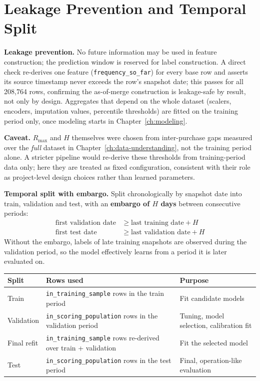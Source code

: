 \section{Leakage Prevention and Temporal Split}
\label{sec:5-6}

\textbf{Leakage prevention.} No future information may be used in feature construction; the prediction window is reserved for label construction. A direct check re-derives one feature (\texttt{frequency\_so\_far}) for every base row and asserts its source timestamp never exceeds the row's snapshot date; this passes for all 208,764 rows, confirming the as-of-merge construction is leakage-safe by result, not only by design. Aggregates that depend on the whole dataset (scalers, encoders, imputation values, percentile thresholds) are fitted on the training period only, once modeling starts in Chapter~\ref{ch:modeling}.

\textbf{Caveat.} $R_{\max}$ and $H$ themselves were chosen from inter-purchase gaps measured over the \emph{full} dataset in Chapter~\ref{ch:data-understanding}, not the training period alone. A stricter pipeline would re-derive these thresholds from training-period data only; here they are treated as fixed configuration, consistent with their role as project-level design choices rather than learned parameters.

\textbf{Temporal split with embargo.} Split chronologically by snapshot date into train, validation and test, with an \textbf{embargo of $H$ days} between consecutive periods:
\begin{align*}
    \text{first validation date} &\geq \text{last training date} + H \\
    \text{first test date} &\geq \text{last validation date} + H
\end{align*}
Without the embargo, labels of late training snapshots are observed during the validation period, so the model effectively learns from a period it is later evaluated on.

\begin{center}
\begin{tabular}{@{}p{2.6cm}p{6.4cm}p{5cm}@{}}
    \toprule
    Split & Rows used & Purpose \\
    \midrule
    Train & \texttt{in\_training\_sample} rows in the train period & Fit candidate models \\
    Validation & \texttt{in\_scoring\_population} rows in the validation period & Tuning, model selection, calibration fit \\
    Final refit & \texttt{in\_training\_sample} rows re-derived over train + validation & Fit the selected model \\
    Test & \texttt{in\_scoring\_population} rows in the test period & Final, operation-like evaluation \\
    \bottomrule
\end{tabular}
\end{center}

